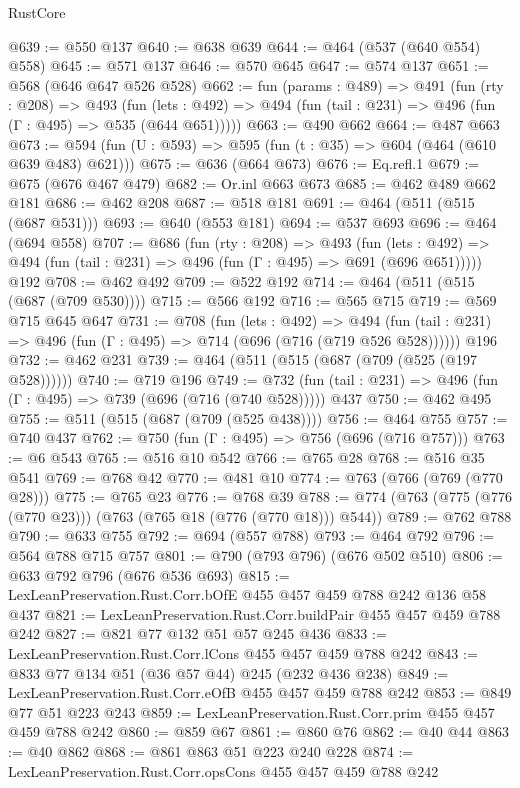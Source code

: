 \begin{lexlean}{RustCore}
\begin{coremodule}
@639 := @550 @137
@640 := @638 @639
@644 := @464 (@537 (@640 @554) @558)
@645 := @571 @137
@646 := @570 @645
@647 := @574 @137
@651 := @568 (@646 @647 @526 @528)
@662 := fun (params : @489) =>
  @491
    (fun (rty : @208) =>
    @493
      (fun (lets : @492) => @494 (fun (tail : @231) => @496 (fun (Γ : @495) => @535 (@644 @651)))))
@663 := @490 @662
@664 := @487 @663
@673 := @594 (fun (U : @593) => @595 (fun (t : @35) => @604 (@464 (@610 @639 @483) @621)))
@675 := @636 (@664 @673)
@676 := Eq.refl.{1}
@679 := @675 (@676 @467 @479)
@682 := Or.inl @663 @673
@685 := @462 @489 @662 @181
@686 := @462 @208
@687 := @518 @181
@691 := @464 (@511 (@515 (@687 @531)))
@693 := @640 (@553 @181)
@694 := @537 @693
@696 := @464 (@694 @558)
@707 := @686
    (fun (rty : @208) =>
    @493
      (fun (lets : @492) => @494 (fun (tail : @231) => @496 (fun (Γ : @495) => @691 (@696 @651)))))
    @192
@708 := @462 @492
@709 := @522 @192
@714 := @464 (@511 (@515 (@687 (@709 @530))))
@715 := @566 @192
@716 := @565 @715
@719 := @569 @715 @645 @647
@731 := @708
    (fun (lets : @492) =>
    @494 (fun (tail : @231) => @496 (fun (Γ : @495) => @714 (@696 (@716 (@719 @526 @528))))))
    @196
@732 := @462 @231
@739 := @464 (@511 (@515 (@687 (@709 (@525 (@197 @528))))))
@740 := @719 @196
@749 := @732 (fun (tail : @231) => @496 (fun (Γ : @495) => @739 (@696 (@716 (@740 @528))))) @437
@750 := @462 @495
@755 := @511 (@515 (@687 (@709 (@525 @438))))
@756 := @464 @755
@757 := @740 @437
@762 := @750 (fun (Γ : @495) => @756 (@696 (@716 @757)))
@763 := @6 @543
@765 := @516 @10 @542
@766 := @765 @28
@768 := @516 @35 @541
@769 := @768 @42
@770 := @481 @10
@774 := @763 (@766 (@769 (@770 @28)))
@775 := @765 @23
@776 := @768 @39
@788 := @774 (@763 (@775 (@776 (@770 @23))) (@763 (@765 @18 (@776 (@770 @18))) @544))
@789 := @762 @788
@790 := @633 @755
@792 := @694 (@557 @788)
@793 := @464 @792
@796 := @564 @788 @715 @757
@801 := @790 (@793 @796) (@676 @502 @510)
@806 := @633 @792 @796 (@676 @536 @693)
@815 := LexLeanPreservation.Rust.Corr.bOfE @455 @457 @459 @788 @242 @136 @58 @437
@821 := LexLeanPreservation.Rust.Corr.buildPair @455 @457 @459 @788 @242
@827 := @821 @77 @132 @51 @57 @245 @436
@833 := LexLeanPreservation.Rust.Corr.lCons @455 @457 @459 @788 @242
@843 := @833 @77 @134 @51 (@36 @57 @44) @245 (@232 @436 @238)
@849 := LexLeanPreservation.Rust.Corr.eOfB @455 @457 @459 @788 @242
@853 := @849 @77 @51 @223 @243
@859 := LexLeanPreservation.Rust.Corr.prim @455 @457 @459 @788 @242
@860 := @859 @67
@861 := @860 @76
@862 := @40 @44
@863 := @40 @862
@868 := @861 @863 @51 @223 @240 @228
@874 := LexLeanPreservation.Rust.Corr.opsCons @455 @457 @459 @788 @242

\end{coremodule}
\end{lexlean}
